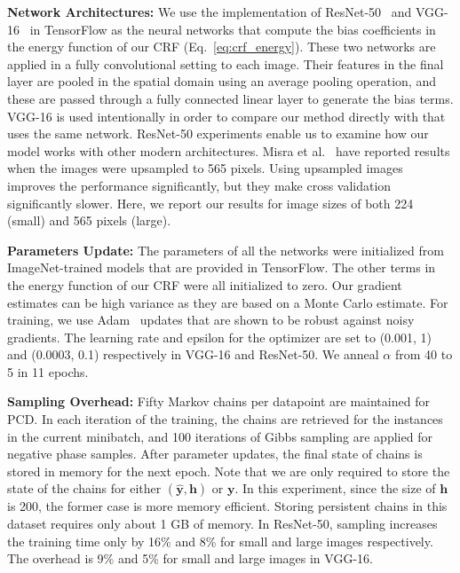 \documentclass{article}
\newcommand{\y}{{\pmb{y}}}
\newcommand{\yh}{{\hat{\pmb{y}}}}
\newcommand{\h}{{\pmb{h}}}
\begin{document}
\textbf{Network Architectures:} We use the implementation of ResNet-50~\cite{he2016deep} and VGG-16~\cite{simonyan2014very} in TensorFlow as the neural networks that compute the bias coefficients in the energy function of our CRF (Eq.~\ref{eq:crf_energy}).
These two networks are applied in a fully convolutional setting to each image. Their features in the final layer are pooled in the spatial domain using an average pooling operation, and these are passed
through a fully connected linear layer to generate the bias terms. VGG-16 is used intentionally in order to compare our method directly with \cite{Misra2016} that uses the same network. ResNet-50
experiments enable us to examine how our model works with other modern architectures. Misra et al.~\cite{Misra2016} have reported results when the images were upsampled to 565 pixels. Using upsampled images
improves the performance significantly, but they make cross validation significantly slower. Here, we report our results for image sizes of both 224 (small) and 565 pixels (large). 

\textbf{Parameters Update:} The parameters of all the networks were initialized from ImageNet-trained models that are provided in TensorFlow. The other terms in the energy function of our CRF 
were all initialized to zero. Our gradient estimates can be high variance as they are based on a Monte Carlo estimate. 
For training, we use Adam~\cite{kingma2014adam} updates that are shown to be robust against noisy gradients. 
The learning rate and epsilon for the optimizer are set to (0.001, 1) and (0.0003, 0.1) respectively in VGG-16 and ResNet-50.
We anneal $\alpha$ from 40 to 5 in 11 epochs.

\textbf{Sampling Overhead:} Fifty Markov chains per datapoint are maintained for PCD. In each iteration of the training,
the chains are retrieved for the instances in the current minibatch, and 100 iterations of Gibbs sampling are applied for negative phase samples. 
After parameter updates, the final state of chains is stored in memory for the next epoch. Note that we are only required to store the state of the 
chains for either $(\yh, \h)$ or $\y$. 
In this experiment, since the size of $\h$ is 200, the former case is more memory efficient. Storing persistent chains in this dataset 
requires only about 1 GB of memory. In ResNet-50, sampling increases the training time only by 16\% and 8\% for small and large images respectively.
The overhead is 9\% and 5\% for small and large images in VGG-16.
\end{document}

